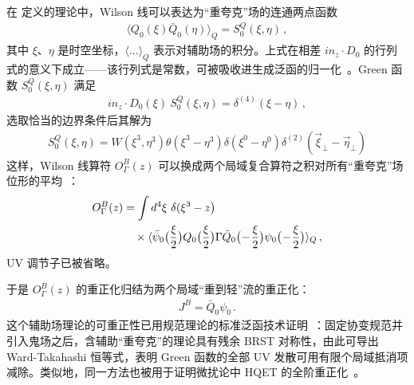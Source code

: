 在  定义的理论中，Wilson 线可以表达为``重夸克''场的连通两点函数
\begin{align}
	\langle Q_0(\xi)\bar{Q}_0(\eta) \rangle_Q = S_0^Q(\xi,\eta)\,,
\end{align}
其中 $\xi$、$\eta$ 是时空坐标，$\langle...\rangle_Q$ 表示对辅助场的积分。上式在相差 $in_z\cdot D_0$ 的行列式的意义下成立——该行列式是常数，可被吸收进生成泛函的归一化~\cite{Mannel:1991mc}。Green 函数 $S_0^Q(\xi,\eta)$ 满足
\begin{align}
	in_z\cdot D_0(\xi)\ S_0^Q(\xi,\eta) = \delta^{(4)}(\xi-\eta)\,,
\end{align}
选取恰当的边界条件后其解为
\begin{align}
	S_0^Q(\xi,\eta)\! =\! W(\xi^3,\eta^3)\theta(\xi^3-\eta^3)\delta(\xi^0-\eta^0)\delta^{(2)}(\vec{\xi}_\perp -\vec{\eta}_\perp)
\end{align}
这样，Wilson 线算符 $O^B_\Gamma(z)$ 可以换成两个局域复合算符之积对所有``重夸克''场位形的平均~\cite{Dorn:1986dt}：
\begin{align} \label{eq:product}
	O^B_{\Gamma}(z)& = \int d^4\xi\ \delta(\xi^3-z\big) \nonumber\\
	&\quad\times \langle \bar{\psi}_0\big({\xi\over2}\big) Q_0\big({\xi\over2}\big)\Gamma\bar{Q}_0\big(\!-\!{\xi\over2}\big)\psi_0\big(\!-\!{\xi\over2}\big)\rangle_Q\,,
\end{align}
UV 调节子已被省略。

于是 $O^B_{\Gamma}(z)$ 的重正化归结为两个局域``重到轻''流的重正化：
\begin{align}
	J^B = \bar{Q}_0 \psi_0\,.
\end{align}
这个辅助场理论的可重正性已用规范理论的标准泛函技术证明~\cite{Dorn:1986dt}：固定协变规范并引入鬼场之后，含辅助``重夸克''的理论具有残余 BRST 对称性，由此可导出 Ward-Takahashi 恒等式，表明 Green 函数的全部 UV 发散可用有限个局域抵消项减除。类似地，同一方法也被用于证明微扰论中 HQET 的全阶重正化~\cite{Bagan:1993zv}。


